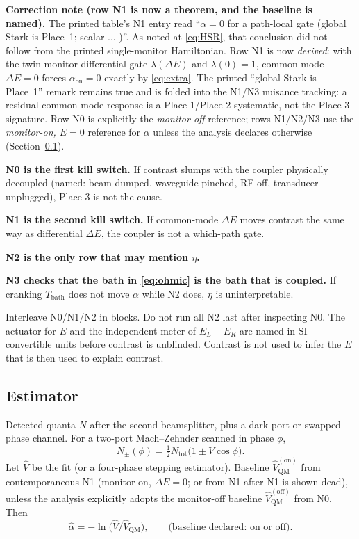 \documentclass[11pt]{article}
\newenvironment{correction}{%
  \par\medskip
  \begin{lrbox}{\corrsave}%
  \begin{minipage}{\dimexpr\linewidth-2\fboxsep}%
    \small
}{%
  \end{minipage}%
  \end{lrbox}%
  \noindent\fcolorbox{corrrule}{corrback}{\usebox\corrsave}%
  \par\medskip
}
\theoremstyle{definition}
\theoremstyle{plain}
\begin{document}
\begin{correction}
\noindent\textbf{Correction note (row N1 is now a theorem, and the baseline is named).}
The printed table's N1 entry read ``$\alpha = 0$ for a path-local gate (global Stark is Place~1; scalar
... )''. As noted at \eqref{eq:HSR}, that conclusion did not follow from the printed single-monitor
Hamiltonian. Row N1 is now \emph{derived}: with the twin-monitor differential gate
$\lambda(\Delta E)$ and $\lambda(0)=1$, common mode $\Delta E = 0$ forces $\alpha_{\mathrm{on}} = 0$ exactly
by \eqref{eq:extra}. The printed ``global Stark is Place~1'' remark remains true and is folded into the
N1/N3 nuisance tracking: a residual common-mode response is a Place-1/Place-2 systematic, not the
Place-3 signature. Row N0 is explicitly the \emph{monitor-off} reference; rows N1/N2/N3 use the
\emph{monitor-on, $E{=}0$} reference for $\alpha$ unless the analysis declares otherwise
(Section~\ref{sec:estimator}).
\end{correction}

\textbf{N0 is the first kill switch.} If contrast slumps with the coupler physically decoupled (named:
beam dumped, waveguide pinched, RF off, transducer unplugged), Place-3 is not the cause.

\textbf{N1 is the second kill switch.} If common-mode $\Delta E$ moves contrast the same way as differential
$\Delta E$, the coupler is not a which-path gate.

\textbf{N2 is the only row that may mention $\eta$.}

\textbf{N3 checks that the bath in \eqref{eq:ohmic} is the bath that is coupled.} If cranking
$T_{\mathrm{bath}}$ does not move $\alpha$ while N2 does, $\eta$ is uninterpretable.

Interleave N0/N1/N2 in blocks. Do not run all N2 last after inspecting N0. The actuator for $E$ and
the independent meter of $E_L - E_R$ are named in SI-convertible units before contrast is unblinded.
Contrast is not used to infer the $E$ that is then used to explain contrast.

\subsection{Estimator}\label{sec:estimator}

Detected quanta $N$ after the second beamsplitter, plus a dark-port or swapped-phase channel.
For a two-port Mach--Zehnder scanned in phase $\phi$,
\begin{equation}
N_\pm(\phi) = \tfrac12 N_{\mathrm{tot}} \big( 1 \pm V\cos\phi \big).
\label{eq:ports}
\end{equation}
Let $\hat{V}$ be the fit (or a four-phase stepping estimator). Baseline $\hat{V}_{\mathrm{QM}} ^{(\mathrm{on})}$ from
contemporaneous N1 (monitor-on, $\Delta E = 0$; or from N1 after N1 is shown dead), unless the
analysis explicitly adopts the monitor-off baseline $\hat{V}_{\mathrm{QM}}^{(\mathrm{off})}$ from N0. Then
\begin{equation}
\hat\alpha = -\ln\Big( \hat{V} / \hat{V}_{\mathrm{QM}} \Big), \qquad
\text{(baseline declared: on or off)}.
\label{eq:alphaest}
\end{equation}
\end{document}
